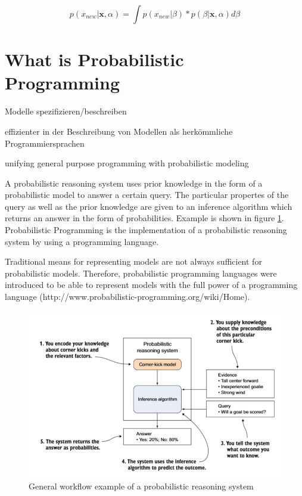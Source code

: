 \documentclass{article}
\begin{document}
\begin{equation}
p(x_{new}|\boldsymbol x, \alpha) = \int p(x_{new}|\beta) * p(\beta | \boldsymbol x,\alpha) d \beta
\label{eq:posterior_predictive}
\end{equation}



\section{What is Probabilistic Programming}

Modelle spezifizieren/beschreiben 

\cite{wiki:Probabilisticprogramminglanguage}

effizienter in der Beschreibung von Modellen als herkömmliche Programmiersprachen \cite{Hardesty2015}

unifying general purpose programming with probabilistic modeling \cite{probabilistic-programming.org}


A \gls{probabilistic reasoning system} uses prior knowledge in the form of a \gls{probabilistic model} to answer a certain query. The particular propertes of the query as well as the prior knowledge are given to an \gls{inference algorithm} which returns an answer in the form of probabilities. Example is shown in figure \ref{fig:example_prs}. Probabilistic Programming is the implementation of a \gls{probabilistic reasoning system} by using a programming language.

Traditional means for representing models are not always sufficient for probabilistic models. Therefore, probabilistic programming languages were introduced to be able to represent models with the full power of a programming language (http://www.probabilistic-programming.org/wiki/Home).


\begin{figure}
\includegraphics[width=\textwidth]{images/probabilistic_reasoning_system.PNG}
\caption[General workflow example of a probabilistic reasoning system. Source: \cite{9781617292330}]{General workflow example of a probabilistic reasoning system}
\label{fig:example_prs}
\end{figure}
\end{document}
